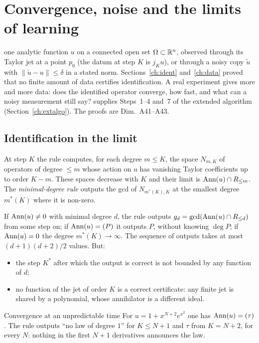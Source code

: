 \section{Convergence, noise and the limits of learning}\label{ch:convergence}
\sectionbrief
{one analytic function $u$ on a connected open set $\Omega\subset\mathbb{R}^n$, observed through its Taylor jet at a point $p_0$ (the datum at step $K$ is $j_Ku$), or through a noisy copy $\tilde u$ with $\|\tilde u-u\|\le\delta$ in a stated norm.}
{Sections~\ref{ch:ident} and~\ref{ch:data} proved that no finite amount of data certifies identification. A real experiment gives more and more data: does the identified operator converge, how fast, and what can a noisy measurement still say?}
{supplies Steps~1--4 and~7 of the extended algorithm (Section~\ref{ch:extalgo}). The proofs are Dim.~A41--A43.}

\subsection{Identification in the limit}

At step $K$ the rule computes, for each degree $m\le K$, the space $N_{m,K}$ of operators of degree $\le m$ whose action on $u$ has vanishing Taylor coefficients up to order $K-m$. These spaces decrease with $K$ and their limit is $\operatorname{Ann}(u)\cap R_{\le m}$. The \emph{minimal-degree rule} outputs the gcd of $N_{m^*(K),K}$ at the smallest degree $m^*(K)$ where it is non-zero.

\begin{theorem}\label{thm:convt1}
If $\operatorname{Ann}(u)\ne0$ with minimal degree $d$, the rule outputs $g_d=\gcd(\operatorname{Ann}(u)\cap R_{\le d})$ from some step on; if $\operatorname{Ann}(u)=(P)$ it outputs $P$, without knowing $\deg P$; if $\operatorname{Ann}(u)=0$ the degree $m^*(K)\to\infty$. The sequence of outputs takes at most $(d+1)(d+2)/2$ values. But:
\begin{itemize}
\item the step $K^*$ after which the output is correct is not bounded by any function of $d$;
\item no function of the jet of order $K$ is a correct certificate: any finite jet is shared by a polynomial, whose annihilator is a different ideal.
\end{itemize}
\end{theorem}

\begin{example}{Convergence at an unpredictable time}
For $u=1+x^{N+2}e^{x^2}$ one has $\operatorname{Ann}(u)=(\tau)$. The rule outputs ``no law of degree $1$'' for $K\le N+1$ and $\tau$ from $K=N+2$, for every $N$: nothing in the first $N+1$ derivatives announces the law.
\end{example}

